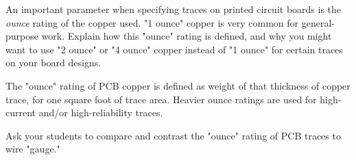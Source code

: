 

An important parameter when specifying traces on printed circuit boards is the {\it ounce} rating of the copper used.  "1 ounce" copper is very common for general-purpose work.  Explain how this "ounce" rating is defined, and why you might want to use "2 ounce" or "4 ounce" copper instead of "1 ounce" for certain traces on your board designs.







The "ounce" rating of PCB copper is defined as weight of that thickness of copper trace, for one square foot of trace area.  Heavier ounce ratings are used for high-current and/or high-reliability traces.







Ask your students to compare and contrast the "ounce" rating of PCB traces to wire "gauge."




